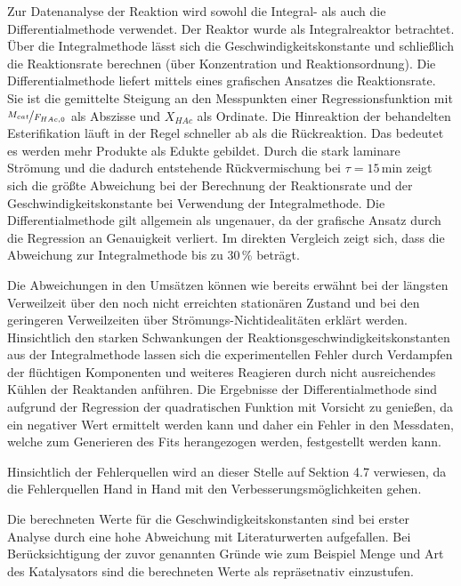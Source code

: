 \documentclass[12pt,liststotoc]{report}
\begin{document}
Zur Datenanalyse der Reaktion wird sowohl die Integral- als auch die Differentialmethode verwendet. Der Reaktor wurde als Integralreaktor betrachtet. Über die Integralmethode lässt sich die Geschwindigkeitskonstante und schließlich die Reaktionsrate berechnen (über Konzentration und Reaktionsordnung). Die Differentialmethode liefert mittels eines grafischen Ansatzes die Reaktionsrate. Sie ist die gemittelte Steigung an den Messpunkten einer Regressionsfunktion mit $\nicefrac{M_{cat}}{F_{HAc,0}}$ als Abszisse und $X_{HAc}$ als Ordinate.\newline
Die Hinreaktion der behandelten Esterifikation läuft in der Regel schneller ab als die Rückreaktion. Das bedeutet es werden mehr Produkte als Edukte gebildet. Durch die stark laminare Strömung und die dadurch entstehende Rückvermischung bei $\tau=15\,\text{min}$ zeigt sich die größte Abweichung bei der Berechnung der Reaktionsrate und der Geschwindigkeitskonstante bei Verwendung der Integralmethode. \newline
Die Differentialmethode gilt allgemein als ungenauer, da der grafische Ansatz durch die Regression an Genauigkeit verliert. Im direkten Vergleich zeigt sich, dass die Abweichung zur Integralmethode bis zu 30\,\% beträgt. 

Die Abweichungen in den Umsätzen können wie bereits erwähnt bei der längsten Verweilzeit über den noch nicht erreichten stationären Zustand und bei den geringeren Verweilzeiten über Strömungs-Nichtidealitäten erklärt werden. Hinsichtlich den starken Schwankungen der Reaktionsgeschwindigkeitskonstanten aus der Integralmethode lassen sich die experimentellen Fehler durch Verdampfen der flüchtigen Komponenten und weiteres Reagieren durch nicht ausreichendes Kühlen der Reaktanden anführen. Die Ergebnisse der Differentialmethode sind aufgrund der Regression der quadratischen Funktion mit Vorsicht zu genießen, da ein negativer Wert ermittelt werden kann und daher ein Fehler in den Messdaten, welche zum Generieren des Fits herangezogen werden, festgestellt werden kann.

Hinsichtlich der Fehlerquellen wird an dieser Stelle auf Sektion 4.7 verwiesen, da die Fehlerquellen Hand in Hand mit den Verbesserungsmöglichkeiten gehen.

Die berechneten Werte für die Geschwindigkeitskonstanten sind bei erster Analyse durch eine hohe Abweichung mit Literaturwerten aufgefallen. Bei Berücksichtigung der zuvor genannten Gründe wie zum Beispiel Menge und Art des Katalysators sind die berechneten Werte als repräsetnativ einzustufen. 
\end{document}

